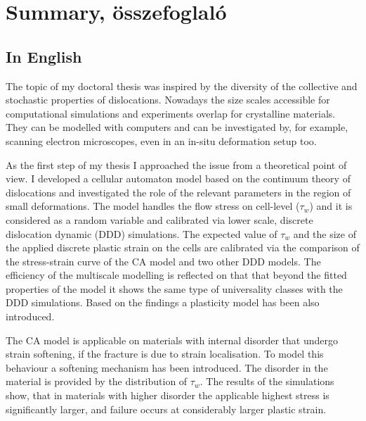\chapter[Summary, összefoglaló]{Summary, összefoglaló} \label{chapter:summary}
\section*{In English}
The topic of my doctoral thesis was inspired by the diversity of the collective and stochastic properties of dislocations. Nowadays the size scales accessible for computational simulations and experiments overlap for crystalline materials. They can be modelled with computers and can be investigated by, for example, scanning electron microscopes, even in an in-situ deformation setup too.

As the first step of my thesis I approached the issue from a theoretical point of view. I developed a cellular automaton model based on the continuum theory of dislocations and investigated the role of the relevant parameters in the region of small deformations. The model handles the flow stress on cell-level ($\tau_w$) and it is considered as a random variable and calibrated via lower scale, discrete dislocation dynamic (DDD) simulations. The expected value of $\tau_w$ and the size of the applied discrete plastic strain on the cells are calibrated via the comparison of the stress-strain curve of the CA model and two other DDD models. The efficiency of the multiscale modelling is reflected on that that beyond the fitted properties of the model it shows the same type of universality classes with the DDD simulations. Based on the findings a plasticity model has been also introduced.

The CA model is applicable on materials with internal disorder that undergo strain softening, if the fracture is due to strain localisation. To model this behaviour a softening mechanism has been introduced. The disorder in the material is provided by the distribution of $\tau_w$. The results of the simulations show, that in materials with higher disorder the applicable highest stress is significantly larger, and failure occurs at considerably larger plastic strain.

